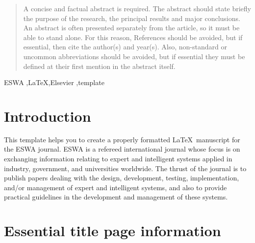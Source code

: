 \documentclass[review]{elsarticle}
\begin{document}
\begin{frontmatter}
\author[label3]{Last Author }

\address[label1]{Full address of first author, including the country name}
\address[label2]{Full address of second author, including the country name}
\address[label3]{Full address of last author, including the country name}

\begin{abstract}
A concise and factual abstract is required. The abstract should state briefly the purpose of the research, the principal results and major conclusions. An abstract is often presented separately from the article, so it must be able to stand alone. For this reason, References should be avoided, but if essential, then cite the author(s) and year(s). Also, non-standard or uncommon abbreviations should be avoided, but if essential they must be defined at their first mention in the abstract itself.
\end{abstract}

\begin{keyword}
ESWA \sep \LaTeX \sep Elsevier \sep template
\end{keyword}

\end{frontmatter}

\section{Introduction}
\label{introduction}

This template helps you to create a properly formatted \LaTeX\ manuscript for the ESWA journal. ESWA is a refereed international journal whose focus is on exchanging information relating to expert and intelligent systems applied in industry, government, and universities worldwide. The thrust of the journal is to publish papers dealing with the design, development, testing, implementation, and/or management of expert and intelligent systems, and also to provide practical guidelines in the development and management of these systems. 

\section{Essential title page information}
\label{title_page}
\end{document}
